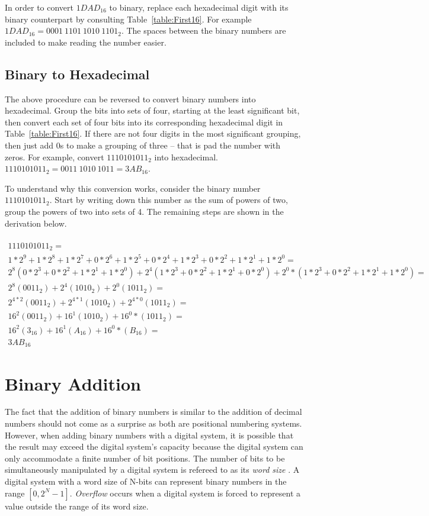 In order to convert $1DAD_{16}$ to binary, replace each hexadecimal
digit with its binary counterpart by consulting Table~\ref{table:First16}.
For example $1DAD_{16} = 0001~1101~1010~1101_{2}$.  The spaces between the
binary numbers are included to make reading the number easier.

\subsection{Binary to Hexadecimal}
The above procedure can be reversed to convert binary numbers into 
hexadecimal.  Group the bits into sets of four, starting at the least
significant bit, then convert each set of four bits into its corresponding
hexadecimal digit in Table~\ref{table:First16}.  
If there are not four digits in the most significant 
grouping, then just add 0s to make a grouping of three -- that is 
pad the number with zeros.  For example, convert  $1110101011_2$ into 
hexadecimal. $1110101011_2 = 0011~1010~1011 = 3AB_{16}$.

To understand why this conversion works, consider the binary 
number $1110101011_2$.  Start by writing down this number as the sum of
powers of two, group the powers of two into sets of 4.  The remaining steps
are shown in the derivation below.
\\ \\
{\tiny
$\begin{array}{l}
1110101011_2= \\
1*2^9+1*2^8+1*2^7+0*2^6+1*2^5+0*2^4+1*2^3+0*2^2+1*2^1+1*2^0 = \\
2^8(0*2^3+0*2^2+1*2^1+1*2^0) + 2^4(1*2^3+0*2^2+1*2^1+0*2^0) + 2^0*(1*2^3+0*2^2+1*2^1+1*2^0) =\\
2^8(0011_2) + 2^4(1010_2) +  2^0(1011_2) =\\
2^{4*2}(0011_2) + 2^{4*1}(1010_2) +  2^{4*0}(1011_2) =\\
16^2(0011_2) + 16^1(1010_2) + 16^0*(1011_2) =\\
16^2(3_{16}) + 16^1(A_{16}) + 16^0*(B_{16}) =\\
3AB_{16}
\end{array}$
} 


\section{Binary Addition}
\label{chapter:numberingAddition}
\label{page:addition}
The fact that the addition of binary numbers is similar to the 
addition of decimal numbers should not come as a surprise as both
are positional numbering systems. However, when adding binary numbers
with a digital system, it is possible that the result may exceed the
digital system's capacity because the digital system can only accommodate a 
finite number of bit positions.  The number of bits to be 
simultaneously manipulated by a digital system is refereed to as 
its \textit{ word size} .  A digital system with a
word size of N-bits can represent binary numbers in the range 
$[0, 2^N-1]$.  \textit{ Overflow}  occurs when a 
digital system is forced to represent a value outside the range 
of its word size.

